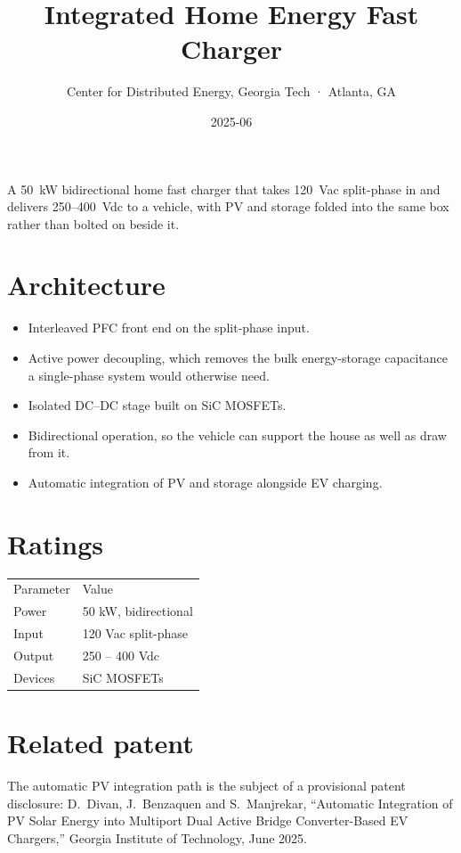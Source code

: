 \title{Integrated Home Energy Fast Charger}
\subtitle{Center for Distributed Energy, Georgia Tech · Atlanta, GA}
\date{2025-06}




A 50~kW bidirectional home fast charger that takes 120~Vac split-phase in and
delivers 250--400~Vdc to a vehicle, with PV and storage folded into the same
box rather than bolted on beside it.

\section{Architecture}

\begin{itemize}
  \item Interleaved PFC front end on the split-phase input.
  \item Active power decoupling, which removes the bulk energy-storage
        capacitance a single-phase system would otherwise need.
  \item Isolated DC--DC stage built on SiC MOSFETs.
  \item Bidirectional operation, so the vehicle can support the house as well
        as draw from it.
  \item Automatic integration of PV and storage alongside EV charging.
\end{itemize}

\section{Ratings}

\begin{tabular}{ll}
  Parameter & Value \\
  Power & 50 kW, bidirectional \\
  Input & 120 Vac split-phase \\
  Output & 250 -- 400 Vdc \\
  Devices & SiC MOSFETs \\
\end{tabular}

\section{Related patent}

The automatic PV integration path is the subject of a provisional patent
disclosure: D.~Divan, J.~Benzaquen and S.~Manjrekar, ``Automatic Integration of
PV Solar Energy into Multiport Dual Active Bridge Converter-Based EV Chargers,''
Georgia Institute of Technology, June 2025.


